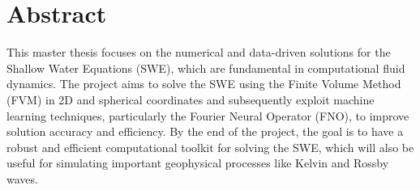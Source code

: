 \chapter*{Abstract}

    This master thesis focuses on the numerical and data-driven solutions for the Shallow Water Equations (SWE), which are fundamental in computational fluid dynamics. The project aims to solve the SWE using the Finite Volume Method (FVM) in 2D and spherical coordinates and subsequently exploit machine learning techniques, particularly the Fourier Neural Operator (FNO), to improve solution accuracy and efficiency. By the end of the project, the goal is to have a robust and efficient computational toolkit for solving the SWE, which will also be useful for simulating important geophysical processes like Kelvin and Rossby waves. 



